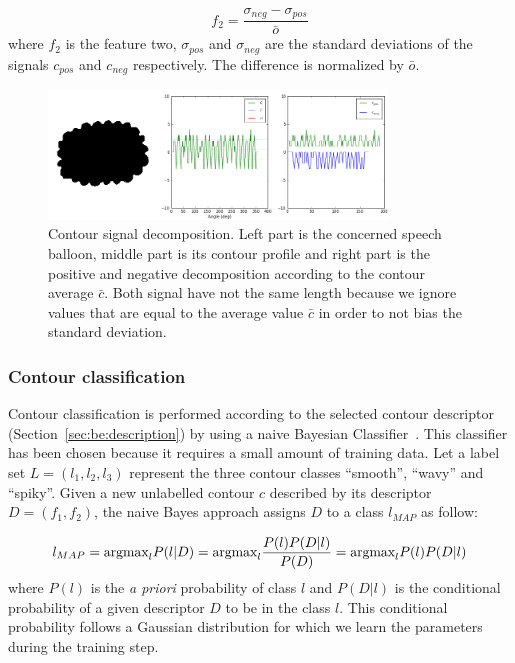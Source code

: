 \begin{equation}\label{eq:be:var_diff}
 f_2 = \frac{\sigma_{neg} - \sigma_{pos}}{\bar{o} }%
\end{equation}
where $f_2$ is the feature two, $\sigma_{pos}$ and $\sigma_{neg}$ are the standard deviations of the signals $c_{pos}$ and $c_{neg}$ respectively. The difference is normalized by $\bar{o}$.%


	\begin{figure}[!ht]	%
	  \centering
		\includegraphics[trim = 0mm 0mm 0mm 0mm, clip, width=340px]{signal_decomposition.png}
		\caption[Contour signal decomposition]{Contour signal decomposition. Left part is the concerned speech balloon, middle part is its contour profile and right part is the positive and negative decomposition according to the contour average $\bar{c}$. Both signal have not the same length because we ignore values that are equal to the average value $\bar{c}$ in order to not bias the standard deviation.}
		\label{fig:be:signal_decomposition}
	\end{figure}


\subsubsection{Contour classification}
Contour classification is performed according to the selected contour descriptor (Section~\ref{sec:be:description}) by using a naive Bayesian Classifier~\cite{Mitchell1997}.
This classifier has been chosen because it requires a small amount of training data.
Let a label set $L=(l_1,l_2,l_3)$ represent the three contour classes ``smooth'', ``wavy'' and ``spiky''.
Given a new unlabelled contour $c$ described by its descriptor $D=(f_1,f_2)$, the naive Bayes approach assigns $D$ to a class $l_{MAP}$ as follow:

\begin{equation}\label{eq:be:fine_class}
  l_{MAP} \\
  = \mbox{argmax}_{l} P(l|D) \\
  = \mbox{argmax}_{l} \frac{P(l) P(D | l)}{P(D)}\\
  = \mbox{argmax}_{l} P(l) P(D | l)
\end{equation}
where $P(l)$ is the \textit{a priori} probability of class $l$ and $P(D|l)$ is the conditional probability of a given descriptor $D$ to be in the class $l$. This conditional probability follows a Gaussian distribution for which we learn the parameters during the training step.


